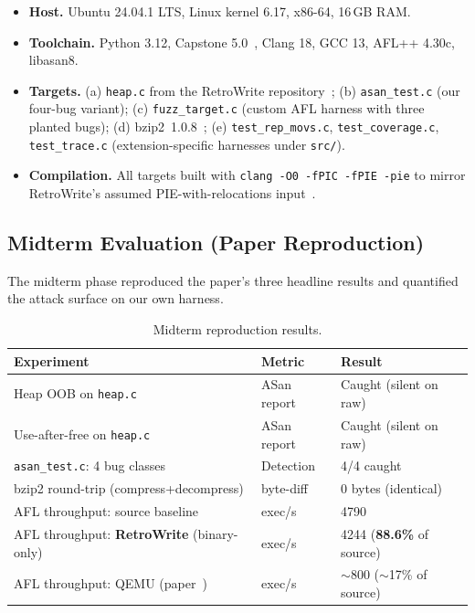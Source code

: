 \documentclass[10pt,a4paper]{article}
\begin{document}
\begin{itemize}
\item \textbf{Host.} Ubuntu 24.04.1 LTS, Linux kernel 6.17, x86-64, 16\,GB RAM.
\item \textbf{Toolchain.} Python 3.12, Capstone 5.0~\cite{capstone},
Clang 18, GCC 13, AFL++ 4.30c, libasan8.
\item \textbf{Targets.} (a) \texttt{heap.c} from the RetroWrite
repository~\cite{retrowrite}; (b) \texttt{asan\_test.c} (our four-bug variant);
(c) \texttt{fuzz\_target.c} (custom AFL harness with three planted bugs);
(d) bzip2~1.0.8~\cite{bzip2}; (e) \texttt{test\_rep\_movs.c},
\texttt{test\_coverage.c}, \texttt{test\_trace.c} (extension-specific harnesses
under \texttt{src/}).
\item \textbf{Compilation.} All targets built with
\texttt{clang -O0 -fPIC -fPIE -pie} to mirror RetroWrite's assumed
PIE-with-relocations input~\cite{retrowrite}.
\end{itemize}

\subsection{Midterm Evaluation (Paper Reproduction)}

The midterm phase reproduced the paper's three headline results and
quantified the attack surface on our own harness.

\begin{table}[H]
\centering
\caption{Midterm reproduction results.}
\label{tab:mid}
\footnotesize
\begin{tabular}{p{5.3cm}p{3.6cm}p{5.3cm}}
\toprule
\textbf{Experiment} & \textbf{Metric} & \textbf{Result} \\
\midrule
\rowcolor{rowgray} Heap OOB on \texttt{heap.c}~\cite{retrowrite} & ASan report & \textcolor{success}{Caught} (silent on raw) \\
Use-after-free on \texttt{heap.c} & ASan report & \textcolor{success}{Caught} (silent on raw) \\
\rowcolor{rowgray} \texttt{asan\_test.c}: 4 bug classes & Detection & \textcolor{success}{4/4 caught} \\
bzip2 round-trip (compress+decompress) & byte-diff & 0 bytes (identical) \\
\rowcolor{rowgray} AFL throughput: source baseline & exec/s & 4790 \\
AFL throughput: \textbf{RetroWrite} (binary-only) & exec/s & 4244 (\textbf{88.6\%} of source) \\
\rowcolor{rowgray} AFL throughput: QEMU (paper~\cite{retrowrite}) & exec/s & $\sim$800 ($\sim$17\% of source) \\
\bottomrule
\end{tabular}
\end{table}
\end{document}
